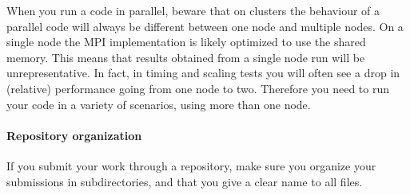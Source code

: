 When you run a code in parallel, beware that on clusters the behaviour
of a parallel code will always be different between one node and
multiple nodes.  On a single node the MPI implementation is likely
optimized to use the shared memory. This means that results obtained
from a single node run will be unrepresentative. In fact, in timing
and scaling tests you will often see a drop in (relative) performance
going from one node to two.  Therefore you need to run your code in a
variety of scenarios, using more than one node.

\paragraph*{Repository organization}

If you submit your work through a repository, make sure you organize your submissions in subdirectories,
and that you give a clear name to all files.
